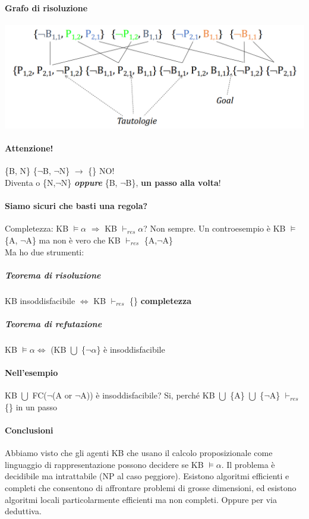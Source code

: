 \documentclass[10pt]{book}
\begin{document}
\paragraph{Grafo di risoluzione}
\begin{center}
	\includegraphics[scale=0.6]{grafosoluz.png}
\end{center}
\paragraph{Attenzione!} \{B, N\} \{$\neg$B, $\neg$N\} $\rightarrow$ \{\} NO!\\
Diventa o \{N,$\neg$N\} \textbf{\textit{oppure}} \{B, $\neg$B\}, \textbf{un passo alla volta}!
\paragraph{Siamo sicuri che basti una regola?} Completezza: KB $\vDash \alpha$ $\Rightarrow$ KB $\vdash_{res} \alpha$? Non sempre. Un controesempio è KB $\vDash$ \{A, $\neg$A\} ma non è vero che KB $\vdash_{res}$ \{A,$\neg$A\}\\
Ma ho due strumenti:
\subparagraph{Teorema di risoluzione} KB insoddisfacibile $\Leftrightarrow$ KB $\vdash_{res}$ \{\} \textbf{completezza}
\subparagraph{Teorema di refutazione} KB $\vDash \alpha \Leftrightarrow$ (KB $\bigcup$ \{$\neg\alpha$\} è insoddisfacibile
\paragraph{Nell'esempio} KB $\bigcup$ FC($\neg$(A or $\neg$A)) è insoddisfacibile? Si, perché
KB $\bigcup$ \{A\} $\bigcup$ \{$\neg$A\} $\vdash_{res}$ \{\} in un passo
\paragraph{Conclusioni}
Abbiamo visto che gli agenti KB che usano il calcolo proposizionale come linguaggio di rappresentazione possono decidere se KB $\vDash \alpha$. Il problema è decidibile ma intrattabile (NP al caso peggiore). Esistono algoritmi efficienti e completi che consentono di affrontare problemi di grosse dimensioni, ed esistono algoritmi locali particolarmente efficienti ma non completi. Oppure per via deduttiva.
\end{document}
